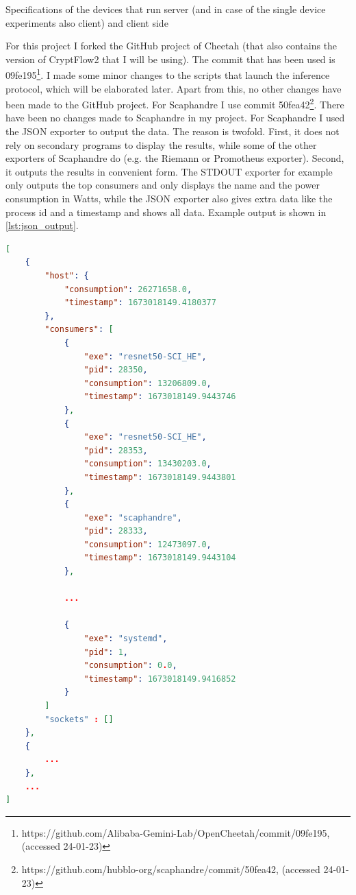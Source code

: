 \documentclass[../thesis.tex]{subfiles}
\begin{document}
\begin{table}
    \begin{adjustbox}{width=\columnwidth,center}
        
    \end{adjustbox}
    \caption{Specifications of the devices that run server (and in case of the single device experiments also client) and client side}
    \label{table:specs}
\end{table}

For this project I forked the GitHub project of Cheetah (that also contains the version of CryptFlow2 that I will be using). The commit that has been used is 09fe195\footnote{https://github.com/Alibaba-Gemini-Lab/OpenCheetah/commit/09fe195,  (accessed 24-01-23)}. I made some minor changes to the scripts that launch the inference protocol, which will be elaborated later. Apart from this, no other changes have been made to the GitHub project. For Scaphandre I use commit 50fea42\footnote{https://github.com/hubblo-org/scaphandre/commit/50fea42, (accessed 24-01-23)}. There have been no changes made to Scaphandre in my project. For Scaphandre I used the JSON exporter to output the data. The reason is twofold. First, it does not rely on secondary programs to display the results, while some of the other exporters of Scaphandre do (e.g. the Riemann or Promotheus exporter). Second, it outputs the results in convenient form. The STDOUT exporter for example only outputs the top consumers and only displays the name and the power consumption in Watts, while the JSON exporter also gives extra data like the process id and a timestamp and shows all data.  Example output is shown in \autoref{lst:json_output}.

\begin{minipage}{\linewidth}
\begin{lstlisting}[caption={Example output of Scaphandre.}, language=JSON, label={lst:json_output}]
[
    {
        "host": {
            "consumption": 26271658.0,
            "timestamp": 1673018149.4180377
        },
        "consumers": [
            {
                "exe": "resnet50-SCI_HE",
                "pid": 28350,
                "consumption": 13206809.0,
                "timestamp": 1673018149.9443746
            },
            {
                "exe": "resnet50-SCI_HE",
                "pid": 28353,
                "consumption": 13430203.0,
                "timestamp": 1673018149.9443801
            },
            {
                "exe": "scaphandre",
                "pid": 28333,
                "consumption": 12473097.0,
                "timestamp": 1673018149.9443104
            },

            ...

            {
                "exe": "systemd",
                "pid": 1,
                "consumption": 0.0,
                "timestamp": 1673018149.9416852
            }
        ]
        "sockets" : []
    },
    {
        ...
    },
    ...
]
\end{lstlisting}
\end{minipage}
\end{document}
